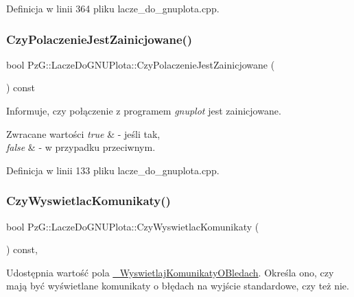 Definicja w linii 364 pliku lacze\+\_\+do\+\_\+gnuplota.\+cpp.

\mbox{\label{class_pz_g_1_1_lacze_do_g_n_u_plota_af8be8aeb3b1b524fab67d4411cba5b9e}} 
\subsubsection{\texorpdfstring{CzyPolaczenieJestZainicjowane()}{CzyPolaczenieJestZainicjowane()}}
{\footnotesize\ttfamily bool Pz\+G\+::\+Lacze\+Do\+G\+N\+U\+Plota\+::\+Czy\+Polaczenie\+Jest\+Zainicjowane (\begin{DoxyParamCaption}{ }\end{DoxyParamCaption}) const}

Informuje, czy połączenie z programem {\itshape gnuplot} jest zainicjowane. 
\begin{DoxyRetVals}{Zwracane wartości}
{\em true} & -\/ jeśli tak, \\
\hline
{\em false} & -\/ w przypadku przeciwnym. \\
\hline
\end{DoxyRetVals}


Definicja w linii 133 pliku lacze\+\_\+do\+\_\+gnuplota.\+cpp.

\mbox{\label{class_pz_g_1_1_lacze_do_g_n_u_plota_a5e4f3a226ed36f7110032d802d84847c}} 
\subsubsection{\texorpdfstring{CzyWyswietlacKomunikaty()}{CzyWyswietlacKomunikaty()}}
{\footnotesize\ttfamily bool Pz\+G\+::\+Lacze\+Do\+G\+N\+U\+Plota\+::\+Czy\+Wyswietlac\+Komunikaty (\begin{DoxyParamCaption}{ }\end{DoxyParamCaption}) const\hspace{0.3cm}{\ttfamily [inline]}, {\ttfamily [protected]}}

Udostępnia wartość pola \mbox{\hyperlink{class_pz_g_1_1_lacze_do_g_n_u_plota_a2f2800f14ebfe1caef0b4d30c410a7fe}{\+\_\+\+Wyswietlaj\+Komunikaty\+O\+Bledach}}. Określa ono, czy mają być wyświetlane komunikaty o błędach na wyjście standardowe, czy też nie. 

